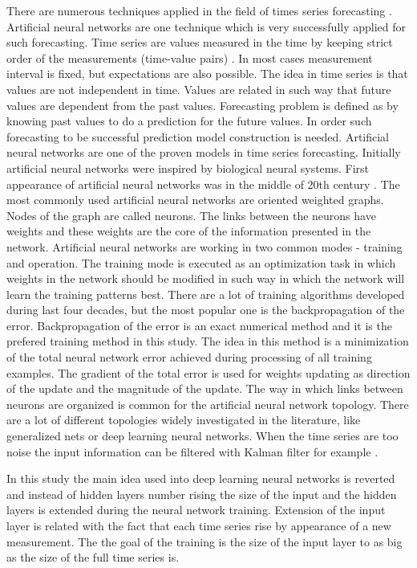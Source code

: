 \documentclass[11pt]{article}
\begin{document}
There are numerous techniques applied in the field of times series forecasting \cite{atanasova01}. Artificial neural networks are one technique which is very successfully applied for such forecasting. Time series are values measured in the time by keeping strict order of the measurements (time-value pairs) \cite{balabanov01}. In most cases measurement interval is fixed, but expectations are also possible. The idea in time series is that values are not independent in time. Values are related in such way that future values are dependent from the past values. Forecasting problem is defined as by knowing past values to do a prediction for the future values. In order such forecasting to be successful prediction model construction is needed. Artificial neural networks are one of the proven models in time series forecasting. Initially artificial neural networks were inspired by biological neural systems. First appearance of artificial neural networks was in the middle of 20th century \cite{balabanov02}. The most commonly used artificial neural networks are oriented weighted graphs. Nodes of the graph are called neurons. The links between the neurons have weights and these weights are the core of the information presented in the network. Artificial neural networks are working in two common modes - training and operation. The training mode is executed as an optimization task in which weights in the network should be modified in such way in which the network will learn the training patterns best. There are a lot of training algorithms developed during last four decades, but the most popular one is the backpropagation of the error. Backpropagation of the error is an exact numerical method and it is the prefered training method in this study. The idea in this method is a minimization of the total neural network error achieved during processing of all training examples. The gradient of the total error is used for weights updating as direction of the update and the magnitude of the update. The way in which links between neurons are organized is common for the artificial neural network topology. There are a lot of different topologies widely investigated in the literature, like generalized nets \cite{tashev01} or deep learning neural networks. When the time series are too noise the input information can be filtered with Kalman filter for example \cite{alexandrov01}. 

In this study the main idea used into deep learning neural networks is reverted and instead of hidden layers number rising the size of the input and the hidden layers is extended during the neural network training. Extension of the input layer is related with the fact that each time series rise by appearance of a new measurement. The the goal of the training is the size of the input layer to as big as the size of the full time series is. 
\end{document}
